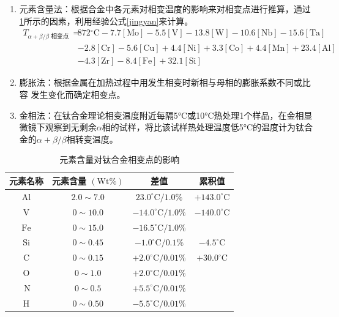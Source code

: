 \documentclass[
class = book,
zihao = -4,
font = noto,
paper = a4paper,
openany
]{easybook}
\begin{document}
\begin{enumerate}
	\item 元素含量法：根据合金中各元素对相变温度的影响来对相变点进行推算，通过\ref{sec:chem4ti}所示\cite{ananyaLocationBasedIntelligent2011}的因素，利用经验公式\ref{jingyan}来计算。
	\begin{equation}
		\begin{aligned}
			T_{\alpha+\beta / \beta \text { 相变点 }}=&872{ }^{\circ} \mathrm{C}-7.7[\mathrm{Mo}]-5.5[\mathrm{V}]-13.8[\mathrm{W}]- 10.6[\mathrm{Nb}]-15.6[\mathrm{Ta}]\\
			&-2.8[\mathrm{Cr}]-5.6[\mathrm{Cu}] +4.4[\mathrm{Ni}]+3.3[\mathrm{Co}]+4.4[\mathrm{Mn}]+23.4[\mathrm{Al}] \\
			& -4.3[\mathrm{Zr}]-8.4[\mathrm{Fe}]+32.1[\mathrm{Si}]
		\end{aligned}
		\label{jingyan}
	\end{equation}
	\item 膨胀法：根据金属在加热过程中用发生相变时新相与母相的膨胀系数不同或比容 发生变化而确定相变点。
	\item 金相法：在钛合金理论相变温度附近每隔5°C或10°C热处理1个样品，在金相显微镜下观察到无剩余$\alpha$相的试样，将比该试样热处理温度低5°C的温度计为钛合金的$\alpha+\beta/\beta$相转变温度。
\end{enumerate}
\begin{table}[htbp]
	\centering
	\caption{元素含量对钛合金相变点的影响}
	\label{sec:chem4ti}
\begin{tabular}{cccc}
	\hline 元素名称 & 元素含量 $(\mathrm{Wt} \%)$ & 差值&累积值 \\
	\hline $\mathrm{Al}$ & $2.0 \sim 7.0$ & $23.0^{\circ} \mathrm{C} / 1.0 \%$ & $+143.0^{\circ} \mathrm{C}$ \\
	$\mathrm{V}$ & $0 \sim 10.0$ & $-14.0^{\circ} \mathrm{C} / 1.0 \%$ & $-140.0^{\circ} \mathrm{C}$ \\
	$\mathrm{Fe}$ & $0 \sim 15.0$ & $-16.5^{\circ} \mathrm{C} / 1.0 \%$ & \\
	$\mathrm{Si}$ & $0 \sim 0.45$ & $-1.0^{\circ} \mathrm{C} / 0.1 \%$ & $ -4.5^{\circ} \mathrm{C} $\\
	$\mathrm{C}$ & $0 \sim 0.15$ & $+2.0^{\circ} \mathrm{C} / 0.01 \%$ &$ +30.0^{\circ} \mathrm{C} $\\
	$\mathrm{O}$ & $0 \sim 1.0$ & $+2.0^{\circ} \mathrm{C} / 0.01 \%$& \\
	$\mathrm{~N}$ & $0 \sim 0.5$ & $+5.5^{\circ} \mathrm{C} / 0.01 \%$& \\
	$\mathrm{H}$ & $0 \sim 0.50$ & $-5.5^{\circ} \mathrm{C} / 0.01 \%$ &\\
	\hline
\end{tabular}
\end{table}
\end{document}
